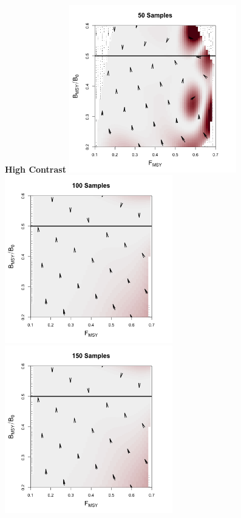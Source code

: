 {\begin{figure}[h!] 
\begin{minipage}[h!]{0.49\textwidth}
\centering
\vspace{-1.5cm}
\textbf{High Contrast}
\includegraphics[width=0.65\textwidth]{../edits/directionalBiasSubPTExpT45MinConnF1.png}\\
\includegraphics[width=0.65\textwidth]{../edits/directionalBiasSubPTExpT45MinCon.png}\\
\includegraphics[width=0.65\textwidth]{../edits/directionalBiasSubPTExpT45MinCon2X.png}\\

\end{minipage}
\end{figure}}
